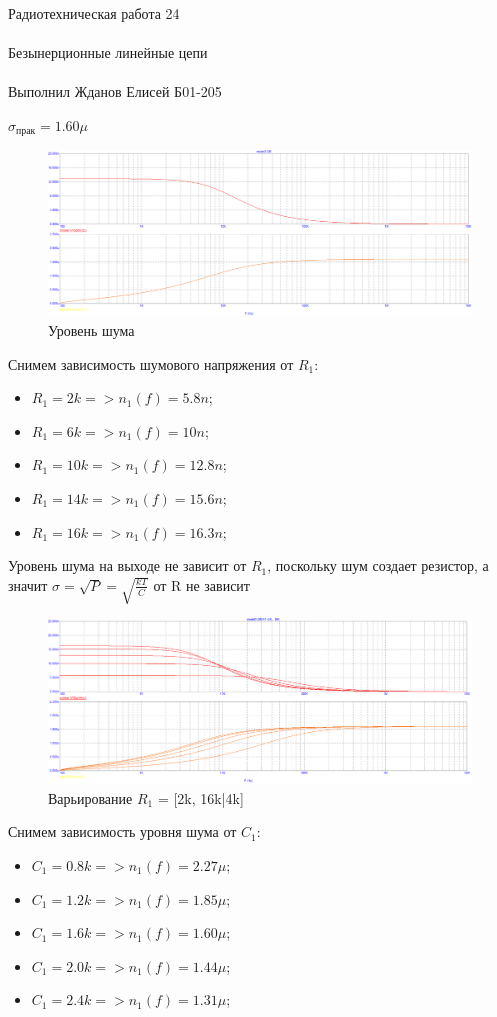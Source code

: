 \documentclass{astroedu-lab}
\begin{document}
\begin{problem}{\huge Радиотехническая работа 24\\\\Безынерционные линейные цепи\\\\Выполнил Жданов Елисей Б01-205}
\begin{enumerate}
$\sigma_\text{прак} = 1.60\mu$

\begin{figure}[h!]
    \centering
    \includegraphics[scale=0.3]{images/mod3_1_2.png}
    \caption{Уровень шума}
    \label{fig:m312}
\end{figure}

\newpage

Снимем зависимость шумового напряжения от $R_1$:
\begin{itemize}
    \item $R_1 = 2k => n_1(f) = 5.8n$;
    \item $R_1 = 6k => n_1(f) = 10n$;
    \item $R_1 = 10k => n_1(f) = 12.8n$;
    \item $R_1 = 14k => n_1(f) = 15.6n$;
    \item $R_1 = 16k => n_1(f) = 16.3n$;
\end{itemize}

Уровень шума на выходе не зависит от $R_1$, поскольку шум создает резистор, а значит $\sigma = \sqrt{P} = \sqrt{\frac{kT}{C}}$ от R не зависит

\begin{figure}[h!]
    \centering
    \includegraphics[scale=0.3]{images/mod3_1_3.png}
    \caption{Варьирование $R_1$ = [2k, 16k|4k]}
    \label{fig:m313}
\end{figure}

Снимем зависимость уровня шума от $C_1$:
\begin{itemize}
    \item $C_1 = 0.8k => n_1(f) = 2.27\mu$;
    \item $C_1 = 1.2k => n_1(f) = 1.85\mu$;
    \item $C_1 = 1.6k => n_1(f) = 1.60\mu$;
    \item $C_1 = 2.0k => n_1(f) = 1.44\mu$;
    \item $C_1 = 2.4k => n_1(f) = 1.31\mu$;
\end{itemize}


\end{enumerate}
\end{problem}
\end{document}
